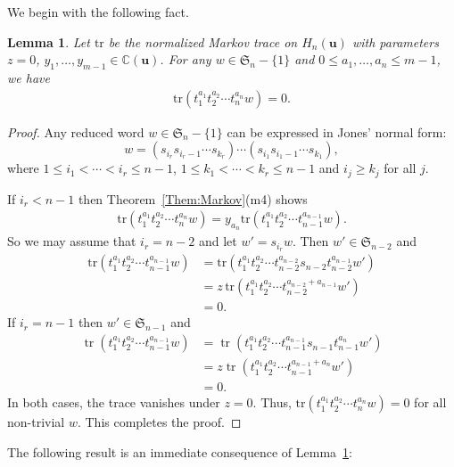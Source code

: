 \documentclass[a4paper, oneside]{amsart}
\numberwithin{equation}{section}
\newtheorem{lemma}[equation]{Lemma}
\theoremstyle{definition}
\theoremstyle{remark}
\begin{document}
We begin with the following fact.
\begin{lemma}\label{Lemm:t-trace}Let $\mathrm{tr}$ be the normalized Markov trace on $H_n(\boldsymbol{u})$ with parameters $z=0$, $y_1, \ldots, y_{m-1}\in \mathbb{C}(\boldsymbol{u})$. For any $w\in \mathfrak{S}_n-\{1\}$ and $0\leq a_1, \ldots, a_n\leq m-1$, we have
 \begin{align*}
\mathrm{tr}(t_1^{a_1}t_2^{a_2}\cdots t_n^{a_n}w)=0.
 \end{align*}
  \end{lemma}
 \begin{proof}Any reduced word $w\in\mathfrak{S}_n-\{1\}$ can be expressed in Jones' normal form:
 \begin{equation*}
  w=(s_{i_r}s_{i_r-1}\cdots s_{k_r})\cdots(s_{i_1}s_{i_1-1}\cdots s_{k_1}),
 \end{equation*}
   where $1\leq i_1<\cdots<i_r\leq n-1$, $1\leq k_1<\cdots<k_r\leq n-1$ and $i_j\geq k_j$ for all $j$.

  If $i_r<{n-1}$ then Theorem~\ref{Them:Markov}(m4) shows \begin{align*}\mathrm{tr}(t_1^{a_1}t_2^{a_2}\cdots t_n^{a_n}w)=y_{a_n}\mathrm{tr}(t_1^{a_1}t_2^{a_2}\cdots t_{n-1}^{a_{n-1}}w).\end{align*}
 So we may assume that $i_r=n-2$ and let $w'=s_{i_r}w$. Then $w'\in\mathfrak{S}_{n-2}$ and \begin{align*}
 \mathrm{tr}(t_1^{a_1}t_2^{a_2}\cdots t_{n-1}^{a_{n-1}}w)&=\mathrm{tr}\left(t_1^{a_1}t_2^{a_2}\cdots t_{n-2}^{a_{n-2}}s_{n-2}t_{n-2}^{a_{n-1}}w'\right)\\
 &=z\,\mathrm{tr}\left(t_1^{a_1}t_2^{a_2}\cdots t_{n-2}^{a_{n-2}+a_{n-1}}w'\right)\\
 &=0.
 \end{align*}
 If $i_r=n-1$ then $w'\in\mathfrak{S}_{n-1}$ and
 \begin{align*}
 \operatorname{tr}(t_1^{a_1}t_2^{a_2}\dotsm t_{n-1}^{a_{n-1}}w)
 &=\operatorname{tr}(t_1^{a_1}t_2^{a_2}\dotsm t_{n-1}^{a_{n-1}}s_{n-1}t_{n-1}^{a_n}w')\\
 &=z\operatorname{tr}(t_1^{a_1}t_2^{a_2}\dotsm t_{n-1}^{a_{n-1}+a_n}w')\\
 &=0.
 \end{align*}
In both cases, the trace vanishes under $z=0$. Thus, $\mathrm{tr}(t_1^{a_1}t_2^{a_2}\cdots t_n^{a_n}w)=0$ for all non-trivial $w$. This completes the proof.
 \end{proof}

The following result is an immediate consequence of Lemma~\ref{Lemm:t-trace}:
\end{document}
